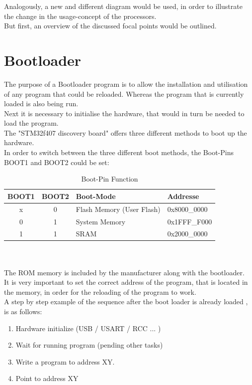 Analogously, a new and different diagram would be used, in order to illustrate the 
change in the usage-concept of the processors.\\

But first, an overview of the discussed focal points would be outlined.\\  


\section{Bootloader}
The purpose of a Bootloader program is to allow the installation and utilisation 
of any program that could be reloaded. Whereas the program that is currently loaded is also being run.\\
Next it is necessary to initialise the hardware, that would in turn be needed to load the program.\\
The "STM32f407 discovery board" offers three different methods to boot up the hardware.\citep{RB-12}\\
In order to switch between the three different boot methods, the Boot-Pins BOOT1
and BOOT2 could be set:
\begin{table}[ht]
\centering
\begin{tabular}{|c|c|l|l|}
\hline \hline
  BOOT1 & BOOT2 & Boot-Mode & Addresse\\ \hline
  x & 0 & Flash Memory (User Flash) & 0x8000\_0000\\
\hline
  0 & 1 & System Memory & 0x1FFF\_F000\\
\hline
 1  & 1 & SRAM & 0x2000\_0000\\
\hline
\end{tabular}
\caption{Boot-Pin Function}
\end{table}\\\\

The ROM memory is included by the manufacturer along with the bootloader.\\
It is very important to set the correct address of the program, that is located 
in the memory, in order for the reloading of the program to work.\\
A step by step example of the sequence after the boot loader is already 
loaded , is as follows:

\begin{enumerate}
\item Hardware initialize (USB / USART / RCC ... )
\item Wait for running program (pending other tasks)
\item Write a program to address XY.
\item Point to address XY
\end{enumerate}

